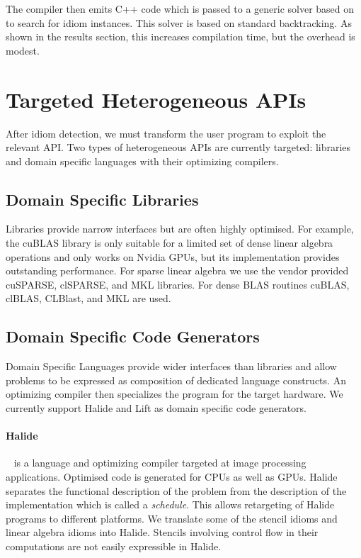     The compiler then emits C++ code which is passed to a generic solver based on \cite{ginsbach2017discovery} to search for idiom instances.
    This solver is based on standard backtracking.
    As shown in the results section, this increases compilation time, but the overhead is modest.

\section{Targeted Heterogeneous APIs}

    After idiom detection, we must transform the user program to exploit the
    relevant API.
    Two types of heterogeneous APIs are currently targeted: libraries and domain
    specific languages with their optimizing compilers.

    \subsection{Domain Specific Libraries}
    Libraries provide narrow interfaces but are often highly optimised.
    For example, the cuBLAS library is only suitable for a limited set of dense
    linear algebra operations and only works on Nvidia GPUs, but its
    implementation provides outstanding performance.
    For sparse linear algebra we use the vendor provided cuSPARSE, clSPARSE, and
    MKL libraries.
    For dense BLAS routines cuBLAS, clBLAS, CLBlast, and MKL are used.

    \subsection{Domain Specific Code Generators}
    Domain Specific Languages provide wider interfaces than libraries and allow
    problems to be expressed as composition of dedicated language constructs.
    An optimizing compiler then specializes the program for the target hardware.
    We currently support Halide and Lift as domain specific code generators.

    \paragraph*{Halide}~\cite{Ragan-Kelley2013Halide} is a language and
    optimizing compiler targeted at image processing applications.
    Optimised code is generated for CPUs as well as GPUs.
    Halide separates the functional description of the problem from the
    description of the implementation which is called a \emph{schedule}.
    This allows retargeting of Halide programs to different platforms.
    We translate some of the stencil idioms and linear algebra idioms into
    Halide.
    Stencils involving control flow in their computations are not easily
    expressible in Halide.

